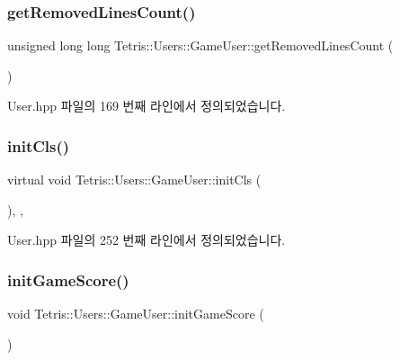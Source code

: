 \subsubsection{\texorpdfstring{get\+Removed\+Lines\+Count()}{getRemovedLinesCount()}}
{\footnotesize\ttfamily unsigned long long Tetris\+::\+Users\+::\+Game\+User\+::get\+Removed\+Lines\+Count (\begin{DoxyParamCaption}{ }\end{DoxyParamCaption})\hspace{0.3cm}{\ttfamily [inline]}}



User.\+hpp 파일의 169 번째 라인에서 정의되었습니다.

\mbox{\label{class_tetris_1_1_users_1_1_game_user_a8ec8ca43d0c6d0dc2c2e049ae1b4d316}} 
\subsubsection{\texorpdfstring{init\+Cls()}{initCls()}}
{\footnotesize\ttfamily virtual void Tetris\+::\+Users\+::\+Game\+User\+::init\+Cls (\begin{DoxyParamCaption}{ }\end{DoxyParamCaption})\hspace{0.3cm}{\ttfamily [inline]}, {\ttfamily [protected]}, {\ttfamily [virtual]}}



User.\+hpp 파일의 252 번째 라인에서 정의되었습니다.

\mbox{\label{class_tetris_1_1_users_1_1_game_user_a746fd00bc5c7efda0cc28fe7bbb855ac}} 
\subsubsection{\texorpdfstring{init\+Game\+Score()}{initGameScore()}}
{\footnotesize\ttfamily void Tetris\+::\+Users\+::\+Game\+User\+::init\+Game\+Score (\begin{DoxyParamCaption}{ }\end{DoxyParamCaption})\hspace{0.3cm}{\ttfamily [inline]}}



